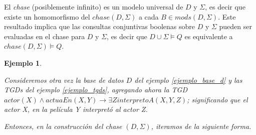\documentclass[11pt,a4paper,twoside]{tesis}
\newtheorem{exmp}{Ejemplo}
\begin{document}
El \textit{chase} (posiblemente infinito) es un modelo universal\cite{JWS}  de $D$ y $\Sigma$, es decir que existe un homomorfismo del $chase(D, \Sigma)$ a cada $B \in mods(D,\Sigma)$. Este resultado implica que las consultas conjuntivas boolenas sobre $D$ y $\Sigma$ pueden ser evaluadas en el chase para $D$ y $\Sigma$, es decir que $D \cup \Sigma \models Q$ es equivalente a $chase(D, \Sigma) \models Q$. 


\begin{exmp}\label{ejemplo_chase}

    Consideremos otra vez la base de datos $D$ del ejemplo \ref{ejemplo_base_d} y las TGDs del ejemplo \ref{ejemplo_tgds}, agregando ahora la TGD $actor(X) \land actuaEn(X, Y) \rightarrow \exists Z interpretoA(X, Y, Z)$; significando que el actor X, en la película Y interpretó al actor Z. 
    
    Entonces, en la construcción del chase $(D, \Sigma)$, iteramos de la siguiente forma.
    

\end{exmp}
\end{document}
